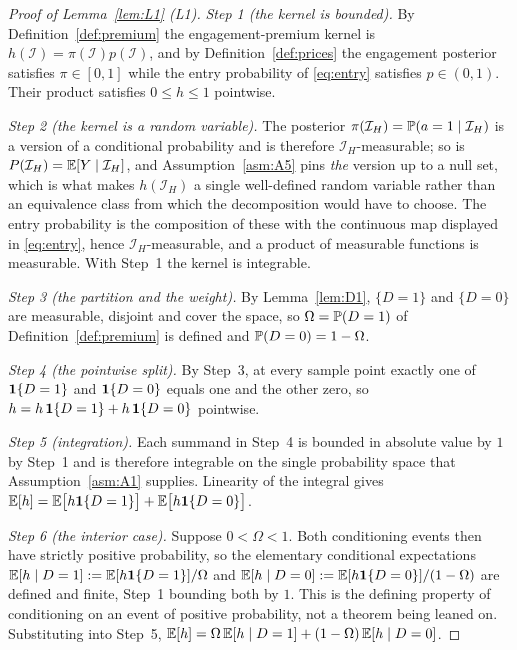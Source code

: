 \begin{proof}[Proof of Lemma~\ref{lem:L1} (L1)]
\emph{Step 1 (the kernel is bounded).} By Definition~\ref{def:premium} the engagement-premium kernel
is $h(\mathcal I) = \pi(\mathcal I)p(\mathcal I)$, and by Definition~\ref{def:prices} the engagement
posterior satisfies $\pi \in [0,1]$ while the entry probability of \eqref{eq:entry} satisfies
$p \in (0,1)$. Their product satisfies $0 \le h \le 1$ pointwise.

\emph{Step 2 (the kernel is a random variable).} The posterior
$\pi(\mathcal I_H) = \mathbb{P}(a=1 \mid \mathcal I_H)$ is a version of a conditional probability and is
therefore $\mathcal I_H$-measurable; so is $P(\mathcal I_H) = \mathbb{E}[Y \mid \mathcal I_H]$, and
Assumption~\ref{asm:A5} pins \emph{the} version up to a null set, which is what makes $h(\mathcal
I_H)$ a single well-defined random variable rather than an equivalence class from which the
decomposition would have to choose. The entry probability is the composition of these with the
continuous map displayed in \eqref{eq:entry}, hence $\mathcal I_H$-measurable, and a product of
measurable functions is measurable. With Step~1 the kernel is integrable.

\emph{Step 3 (the partition and the weight).} By Lemma~\ref{lem:D1}, $\{D=1\}$ and $\{D=0\}$ are
measurable, disjoint and cover the space, so $\Omega = \mathbb{P}(D=1)$ of Definition~\ref{def:premium} is
defined and $\mathbb{P}(D=0) = 1-\Omega$.

\emph{Step 4 (the pointwise split).} By Step~3, at every sample point exactly one of
$\mathbf{1}\{D=1\}$ and $\mathbf{1}\{D=0\}$ equals one and the other zero, so
$h = h\,\mathbf{1}\{D=1\} + h\,\mathbf{1}\{D=0\}$ pointwise.

\emph{Step 5 (integration).} Each summand in Step~4 is bounded in absolute value by $1$ by Step~1 and
is therefore integrable on the single probability space that Assumption~\ref{asm:A1} supplies.
Linearity of the integral gives
$\mathbb{E}[h] = \mathbb{E}\bigl[h\mathbf{1}\{D=1\}\bigr] + \mathbb{E}\bigl[h\mathbf{1}\{D=0\}\bigr]$.

\emph{Step 6 (the interior case).} Suppose $0 < \Omega < 1$. Both conditioning events then have
strictly positive probability, so the elementary conditional expectations
$\mathbb{E}[h \mid D=1] := \mathbb{E}[h\mathbf{1}\{D=1\}]/\Omega$ and
$\mathbb{E}[h \mid D=0] := \mathbb{E}[h\mathbf{1}\{D=0\}]/(1-\Omega)$ are defined and finite, Step~1 bounding both by
$1$. This is the defining property of conditioning on an event of positive probability, not a theorem
being leaned on. Substituting into Step~5,
$\mathbb{E}[h] = \Omega\,\mathbb{E}[h \mid D=1] + (1-\Omega)\,\mathbb{E}[h \mid D=0]$.


\end{proof}
